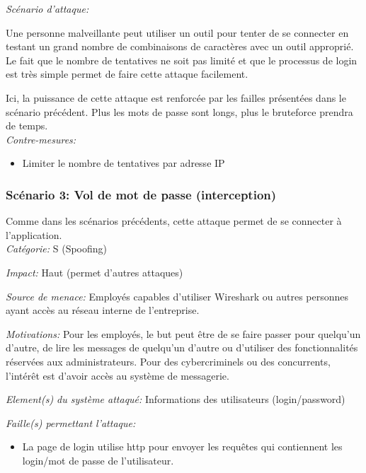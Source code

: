 \documentclass{article}
\begin{document}
\textit{Scénario d'attaque:}

Une personne malveillante peut utiliser un outil pour tenter de se
connecter en testant un grand nombre de combinaisons de caractères avec
un outil approprié. Le fait que le nombre de tentatives ne soit pas
limité et que le processus de login est très simple permet de faire
cette attaque facilement.

Ici, la puissance de cette attaque est renforcée par les failles
présentées dans le scénario précédent. Plus les mots de passe sont
longs, plus le bruteforce prendra de temps.\\

\textit{Contre-mesures:}

\begin{itemize}

\item
  Limiter le nombre de tentatives par adresse IP
\end{itemize}

\subsubsection{Scénario 3: Vol de mot de passe (interception)}

Comme dans les scénarios précédents, cette attaque permet de se
connecter à l'application.\\

\textit{Catégorie:} S (Spoofing)

\textit{Impact:} Haut (permet d'autres attaques)

\textit{Source de menace:} Employés capables d'utiliser Wireshark ou
autres personnes ayant accès au réseau interne de l'entreprise.

\textit{Motivations:} Pour les employés, le but peut être de se faire passer pour quelqu'un
  d'autre, de lire les messages de quelqu'un d'autre ou d'utiliser des
  fonctionnalités réservées aux administrateurs. Pour des cybercriminels ou des concurrents, l'intérêt est d'avoir
  accès au système de messagerie.


\textit{Element(s) du système attaqué:} Informations des utilisateurs
(login/password)

\textit{Faille(s) permettant l'attaque:}

\begin{itemize}

\item
  La page de login utilise http pour envoyer les requêtes qui
  contiennent les login/mot de passe de l'utilisateur.
\end{itemize}
\end{document}

